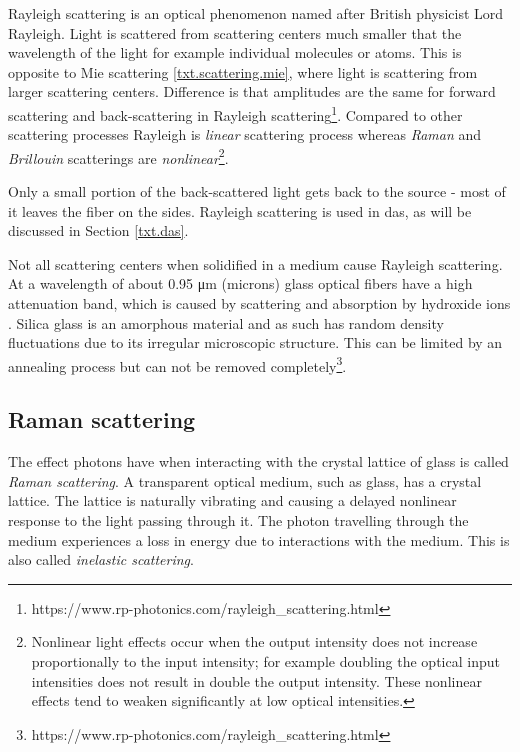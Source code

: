 Rayleigh scattering is an optical phenomenon named after British physicist Lord Rayleigh. Light is scattered from scattering centers much smaller that the wavelength of the light for example individual molecules or atoms. This is opposite to Mie scattering \ref{txt.scattering.mie}, where light is scattering from larger scattering centers. Difference is that amplitudes are the same for forward scattering and back-scattering in Rayleigh scattering\footnote{https://www.rp-photonics.com/rayleigh\_scattering.html}. Compared to other scattering processes Rayleigh is \textit{linear} scattering process whereas \textit{Raman} and \textit{Brillouin} scatterings are \textit{nonlinear}\footnote{Nonlinear light effects occur when the output intensity does not increase proportionally to the input intensity; for example doubling the optical input intensities does not result in double the output intensity. These nonlinear effects tend to weaken significantly at low optical intensities.}.

Only a small portion of the back-scattered light gets back to the source - most of it leaves the fiber on the sides. Rayleigh scattering is used in \ac{das}, as will be discussed in Section \ref{txt.das}.

Not all scattering centers when solidified in a medium cause Rayleigh scattering. At a wavelength of about 0.95 μm (microns) glass optical fibers have a high attenuation band, which is caused by scattering and absorption by hydroxide ions \cite{scatteringcenterbook}. Silica glass is an amorphous material and as such has random density fluctuations due to its irregular microscopic structure. This can be limited by an annealing process but can not be removed completely\footnote{https://www.rp-photonics.com/rayleigh\_scattering.html}.




\subsection{Raman scattering}\label{txt.scattering.ram}

The effect photons have when interacting with the crystal lattice of glass is called \textit{Raman scattering}. A transparent optical medium, such as glass, has a crystal lattice. The lattice is naturally vibrating and causing a delayed nonlinear response to the light passing through it. The photon travelling through the medium experiences a loss in energy due to interactions with the medium. This is also called \textit{inelastic scattering}. 

